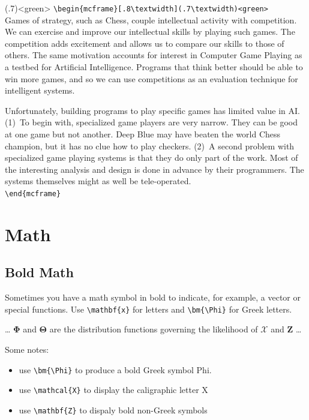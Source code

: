 \documentclass{book}\usepackage[]{graphicx}\usepackage[]{color}
\begin{document}
\begin{mcframe}[.8\textwidth](.7\textwidth)<green>
\verb+\begin{mcframe}[.8\textwidth](.7\textwidth)<green>+\\
Games of strategy, such as Chess, couple intellectual activity with
competition.
We can exercise and improve our intellectual skills by playing such games.
The competition adds excitement and allows us to
compare our skills to those of others.
The same motivation accounts for
interest in Computer Game Playing as a testbed for Artificial Intelligence.
Programs that think better should be able to win more
games, and so we can use competitions as an evaluation technique for
intelligent systems.

Unfortunately, building programs to play specific games has limited
value in AI.  (1)~To begin with, specialized game players are very narrow.
They can be good at one game but not another. Deep Blue may have beaten
the world Chess champion, but it has no clue how to play checkers.  (2)~A
second problem with specialized game playing systems is that they do only
part of the work. Most of the interesting analysis and design is done in
advance by their programmers. The systems themselves might as well be
tele-operated.\\
\verb+\end{mcframe}+
\end{mcframe}

\clearpage

    


\chapter{Math}
\label{ch05}

\section{Bold Math}
Sometimes you have a math symbol in bold to indicate, for example,
a vector or special functions. Use \verb+\mathbf{x}+ for letters
and \verb+\bm{\Phi}+ for Greek letters.

\noindent
\ldots
$\bm{\Phi}$ and $\bm{\Theta}$ are the distribution functions
governing the likelihood of $\mathcal{X}$ and $\mathbf{Z}$ \ldots

\blankline
Some notes:
\begin{itemize}
\item
use \verb+\bm{\Phi}+ to produce a bold Greek symbol Phi.
\item
use \verb+\mathcal{X}+ to display the caligraphic letter X
\item
use \verb+\mathbf{Z}+ to dispaly bold non-Greek symbols
\end{itemize}
\end{document}
